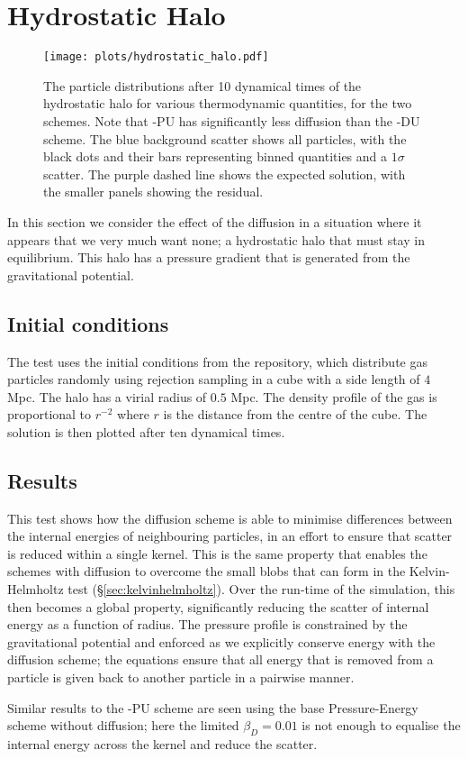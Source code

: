 \section{Hydrostatic Halo}

\begin{figure*}
    \centering
    \texttt{[image: plots/hydrostatic\_halo.pdf]}
    \vspace{-0.7cm}
    \caption{The particle distributions after 10 dynamical times
    of the hydrostatic halo for various thermodynamic quantities, for the
    two \anarchy{} schemes. Note that \anarchy{}-PU has significantly less
    diffusion than the \anarchy{}-DU scheme. The blue background scatter
    shows all particles, with the black dots and their bars representing
    binned quantities and a $1\sigma$ scatter. The purple dashed line shows
    the expected solution, with the smaller panels showing the residual.}
    \label{fig:hydrostatichalo}
\end{figure*}

In this section we consider the effect of the diffusion in a situation where
it appears that we very much want none; a hydrostatic halo that must stay in
equilibrium. This halo has a pressure gradient that is generated from the
gravitational potential.

\subsection{Initial conditions}

The test uses the initial conditions from the \swift{} repository, which
distribute gas particles randomly using rejection sampling in a cube with a
side length of $4$ Mpc. The halo has a virial radius of $0.5$ Mpc. The
density profile of the gas is proportional to $r^{-2}$ where $r$ is the
distance from the centre of the cube. The solution is then plotted after ten
dynamical times.

\subsection{Results}

This test shows how the diffusion scheme is able to minimise differences between
the internal energies of neighbouring particles, in an effort to ensure that scatter
is reduced within a single kernel. This is the same property that enables
the schemes with diffusion to overcome the small blobs that can form in 
the Kelvin-Helmholtz test (\S \ref{sec:kelvinhelmholtz}). Over the run-time of the
simulation, this then becomes a global property, significantly reducing the scatter
of internal energy as a function of radius. The pressure profile is constrained by
the gravitational potential and enforced as we explicitly conserve energy with
the diffusion scheme; the equations ensure that all energy that is removed from 
a particle is given back to another particle in a pairwise manner.

Similar results to the \anarchy{}-PU scheme are seen using the base Pressure-Energy
scheme without diffusion; here the limited $\beta_D = 0.01$ is not enough to equalise
the internal energy across the kernel and reduce the scatter. 